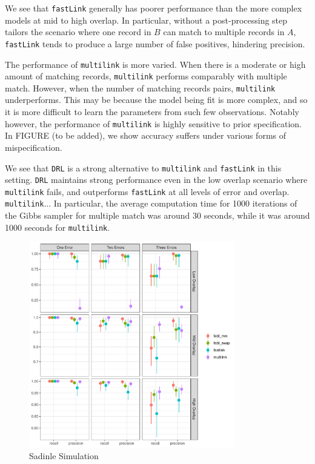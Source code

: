 \documentclass[12pt,letterpaper]{article}
\newcommand{\1}[1]{\mathbb{I}\!\left[#1\right]} %
\begin{document}
We see that \texttt{fastLink} generally has poorer performance than the more complex models at mid to high overlap. In particular, without a post-processing step tailors the scenario where one record in $B$ can match to multiple records in $A$, \texttt{fastLink} tends to produce a large number of false positives, hindering precision. 

The performance of \texttt{multilink} is more varied. When there is a moderate or high amount of matching records, \texttt{multilink} performs comparably with multiple match. However, when the number of matching records pairs, \texttt{multilink} underperforms. This may be because the model being fit is more complex, and so it is more difficult to learn the parameters from such few observations. Notably however, the performance of \texttt{multilink} is highly sensitive to prior specification. In FIGURE (to be added), we show accuracy suffers under various forms of mispecification.




We see that \texttt{DRL} is a strong alternative to \texttt{multilink} and \texttt{fastLink} in this setting. \texttt{DRL} maintains strong performance even in the low overlap scenario where \texttt{multilink} fails, and outperforms \texttt{fastLink} at all levels of error and overlap. \texttt{multilink}... In particular, the average computation time for 1000 iterations of the Gibbs sampler for multiple match was around 30 seconds, while it was around 1000 seconds for \texttt{multilink}. 

\begin{figure}[t]
	\centering
	\includegraphics[width=0.8\textwidth]{../Rplots.pdf}
	\caption{Sadinle Simulation}
	\label{fig:sadinle}
\end{figure}
\end{document}
